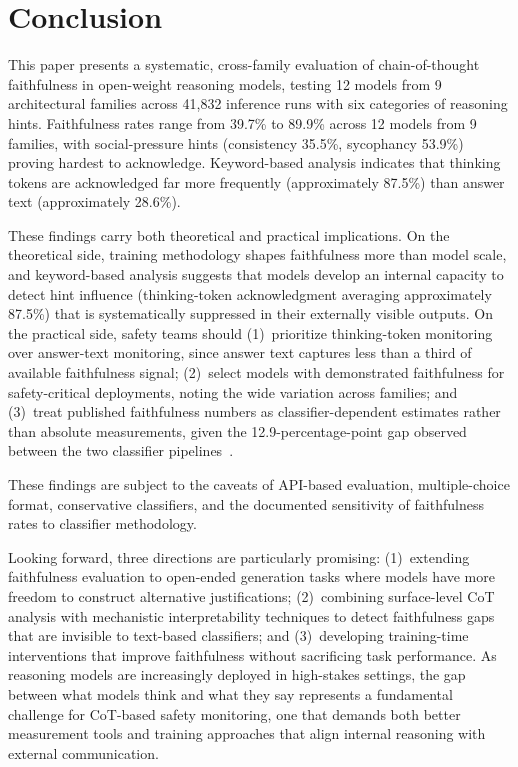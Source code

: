 
\section{Conclusion}

This paper presents a systematic, cross-family evaluation of chain-of-thought
faithfulness in open-weight reasoning models, testing 12 models from 9
architectural families across 41,832 inference runs with six categories of
reasoning hints. Faithfulness rates range from 39.7\% to 89.9\% across 12
models from 9 families, with social-pressure hints (consistency 35.5\%,
sycophancy 53.9\%) proving hardest to acknowledge. Keyword-based analysis
indicates that thinking tokens are acknowledged far more frequently
(approximately 87.5\%) than answer text (approximately 28.6\%).

These findings carry both theoretical and practical implications. On the
theoretical side, training methodology shapes faithfulness more than model
scale, and keyword-based analysis suggests that models develop an internal
capacity to detect hint influence (thinking-token acknowledgment averaging
approximately 87.5\%) that is systematically suppressed in their externally
visible outputs. On the practical
side, safety teams should (1)~prioritize thinking-token monitoring over
answer-text monitoring, since answer text captures less than a third of
available faithfulness signal; (2)~select models with demonstrated faithfulness
for safety-critical deployments, noting the wide variation across families; and
(3)~treat published faithfulness numbers as classifier-dependent estimates rather
than absolute measurements, given the 12.9-percentage-point gap observed
between the two classifier pipelines~\cite{young2026classifier}.

These findings are subject to the caveats of API-based evaluation,
multiple-choice format, conservative classifiers, and the documented sensitivity
of faithfulness rates to classifier methodology.

Looking forward, three directions are particularly promising: (1)~extending
faithfulness evaluation to open-ended generation tasks where models have more
freedom to construct alternative justifications; (2)~combining surface-level
CoT analysis with mechanistic interpretability techniques to detect faithfulness
gaps that are invisible to text-based classifiers; and (3)~developing
training-time interventions that improve faithfulness without sacrificing task
performance. As reasoning models are increasingly deployed in high-stakes
settings, the gap between what models think and what they say represents a
fundamental challenge for CoT-based safety monitoring, one that demands both
better measurement tools and training approaches that align internal reasoning
with external communication.
